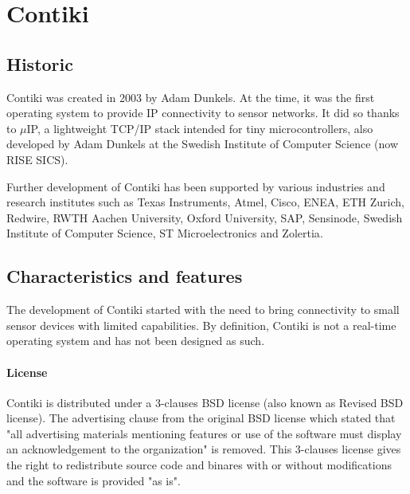 \section{Contiki}

\subsection{Historic}
Contiki\cite{contiki} was created in 2003 by Adam Dunkels\cite{AdamDunkels}. %
At the time, it was the first operating system to provide IP connectivity to sensor networks.
It did so thanks to $\mu$IP\cite{uip}, a lightweight TCP/IP stack intended for tiny microcontrollers,
    also developed by Adam Dunkels at the Swedish Institute of Computer Science (now RISE SICS).%

Further development of Contiki has been supported by various industries and research institutes 
    such as Texas Instruments, Atmel, Cisco, ENEA, ETH Zurich, Redwire, RWTH Aachen University, 
    Oxford University, SAP, Sensinode, Swedish Institute of Computer Science, ST Microelectronics and Zolertia\cite{Contiki2}.

\subsection{Characteristics and features}
The development of Contiki started with the need to bring connectivity to small sensor devices with limited capabilities.
By definition, Contiki is not a real-time operating system and has not been designed as such.

\paragraph{License} Contiki is distributed under a 3-clauses BSD license (also known as Revised BSD license).
The advertising clause from the original BSD license which stated that "all advertising materials mentioning features or use of the software
must display an acknowledgement to the organization" is removed.
This 3-clauses license gives the right to redistribute source code and binares with or without modifications
    and the software is provided "as is".


